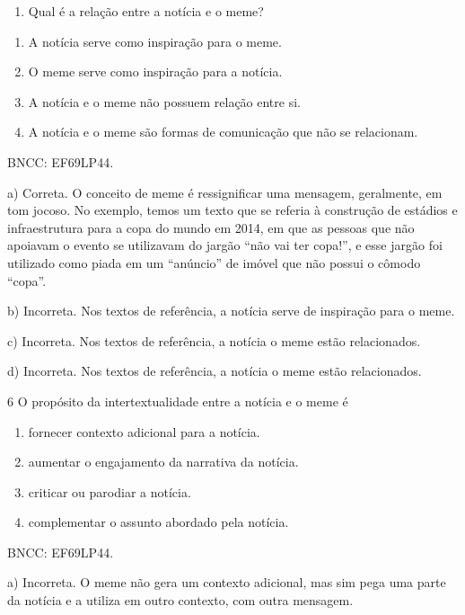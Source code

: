
\begin{enumerate}
\def\labelenumi{\arabic{enumi}.}
\setcounter{enumi}{4}
\tightlist
\item
  Qual é a relação entre a notícia e o meme?
\end{enumerate}

\begin{enumerate}
\def\labelenumi{\alph{enumi})}
\item
  A notícia serve como inspiração para o meme.
\item
  O meme serve como inspiração para a notícia.
\item
  A notícia e o meme não possuem relação entre si.
\item
  A notícia e o meme são formas de comunicação que não se relacionam.
\end{enumerate}

BNCC: EF69LP44.

a) Correta. O conceito de meme é ressignificar uma mensagem, geralmente,
em tom jocoso. No exemplo, temos um texto que se referia à construção de
estádios e infraestrutura para a copa do mundo em 2014, em que as
pessoas que não apoiavam o evento se utilizavam do jargão ``não vai ter
copa!'', e esse jargão foi utilizado como piada em um ``anúncio'' de
imóvel que não possui o cômodo ``copa''.

b) Incorreta. Nos textos de referência, a notícia serve de inspiração
para o meme.

c) Incorreta. Nos textos de referência, a notícia o meme estão
relacionados.

d) Incorreta. Nos textos de referência, a notícia o meme estão
relacionados.

\num{6} O propósito da intertextualidade entre a notícia e o meme é

\begin{enumerate}
\def\labelenumi{\alph{enumi})}
\item
  fornecer contexto adicional para a notícia.
\item
  aumentar o engajamento da narrativa da notícia.
\item
  criticar ou parodiar a notícia.
\item
  complementar o assunto abordado pela notícia.
\end{enumerate}

BNCC: EF69LP44.

a) Incorreta. O meme não gera um contexto adicional, mas sim pega uma
parte da notícia e a utiliza em outro contexto, com outra mensagem.


